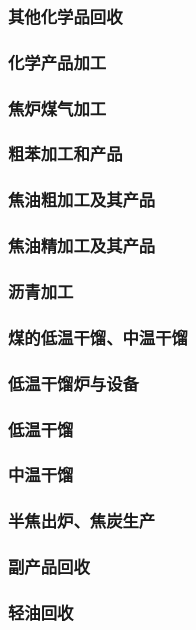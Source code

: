 \documentclass[UTF8]{../../ApplicationUniverse}
\begin{document}
        \subsubsection{其他化学品回收}
    \subsubsection{化学产品加工}
        \subsubsection{焦炉煤气加工}
        \subsubsection{粗苯加工和产品}
        \subsubsection{焦油粗加工及其产品}
        \subsubsection{焦油精加工及其产品}
        \subsubsection{沥青加工}
\subsubsection{煤的低温干馏、中温干馏}
    \subsubsection{低温干馏炉与设备}
    \subsubsection{低温干馏}
    \subsubsection{中温干馏}
    \subsubsection{半焦出炉、焦炭生产}
    \subsubsection{副产品回收}
        \subsubsection{轻油回收}
\end{document}
